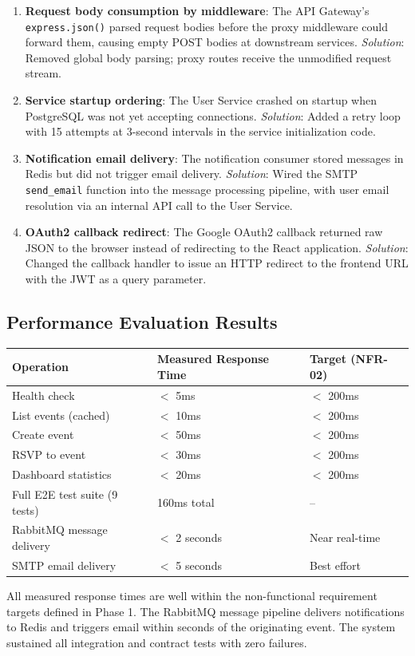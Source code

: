 \documentclass[12pt,a4paper]{article}
\begin{document}
\begin{enumerate}
    \item \textbf{Request body consumption by middleware}: The API Gateway's \texttt{express.json()} parsed request bodies before the proxy middleware could forward them, causing empty POST bodies at downstream services. \textit{Solution}: Removed global body parsing; proxy routes receive the unmodified request stream.
    \item \textbf{Service startup ordering}: The User Service crashed on startup when PostgreSQL was not yet accepting connections. \textit{Solution}: Added a retry loop with 15 attempts at 3-second intervals in the service initialization code.
    \item \textbf{Notification email delivery}: The notification consumer stored messages in Redis but did not trigger email delivery. \textit{Solution}: Wired the SMTP \texttt{send\_email} function into the message processing pipeline, with user email resolution via an internal API call to the User Service.
    \item \textbf{OAuth2 callback redirect}: The Google OAuth2 callback returned raw JSON to the browser instead of redirecting to the React application. \textit{Solution}: Changed the callback handler to issue an HTTP redirect to the frontend URL with the JWT as a query parameter.
\end{enumerate}

\subsection{Performance Evaluation Results}

\begin{longtable}{@{}p{5cm}p{4cm}p{4cm}@{}}
\toprule
\textbf{Operation} & \textbf{Measured Response Time} & \textbf{Target (NFR-02)} \\
\midrule
Health check & $<$ 5ms & $<$ 200ms \\
List events (cached) & $<$ 10ms & $<$ 200ms \\
Create event & $<$ 50ms & $<$ 200ms \\
RSVP to event & $<$ 30ms & $<$ 200ms \\
Dashboard statistics & $<$ 20ms & $<$ 200ms \\
Full E2E test suite (9 tests) & 160ms total & -- \\
RabbitMQ message delivery & $<$ 2 seconds & Near real-time \\
SMTP email delivery & $<$ 5 seconds & Best effort \\
\bottomrule
\end{longtable}

All measured response times are well within the non-functional requirement targets defined in Phase 1. The RabbitMQ message pipeline delivers notifications to Redis and triggers email within seconds of the originating event. The system sustained all integration and contract tests with zero failures.
\end{document}
